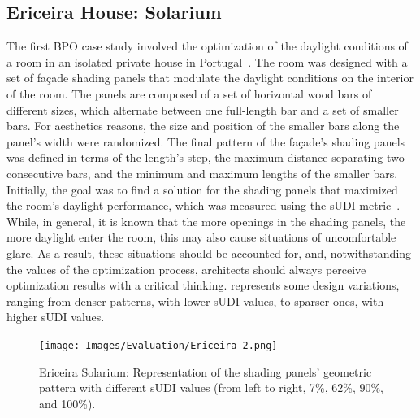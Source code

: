\subsection{Ericeira House: Solarium}
The first \ac{BPO} case study involved the optimization of the daylight conditions of a room in an isolated private house in Portugal~\cite{Caetano2018,Belem2018optimizeddesign}. The room was designed with a set of façade shading panels that modulate the daylight conditions on the interior of the room. The panels are composed of a set of horizontal wood bars of different sizes, which alternate between one full-length bar and a set of smaller bars. For aesthetics reasons, the size and position of the smaller bars along the panel's width were randomized. The final pattern of the façade's shading panels was defined in terms of the length’s step, the maximum distance separating two consecutive bars, and the minimum and maximum lengths of the smaller bars. Initially, the goal was to find a solution for the shading panels that maximized the room's daylight performance, which was measured using the \ac{sUDI} metric~\cite{Nabil2006}. While, in general, it is known that the more openings in the shading panels, the more daylight enter the room, this may also cause situations of uncomfortable glare. As a result, these situations should be accounted for, and, notwithstanding the values of the optimization process, architects should always perceive optimization results with a critical thinking.  represents some design variations, ranging from denser patterns, with lower \ac{sUDI} values, to sparser ones, with higher \ac{sUDI} values.


\begin{figure}[htpb]
	\centering
	\texttt{[image: Images/Evaluation/Ericeira\_2.png]}
	\caption{Ericeira Solarium: Representation of the shading panels’ geometric pattern with different sUDI values (from left to right, 7\%, 62\%, 90\%, and 100\%).}
	\label{fig:ericeira_multiple_panels}
\end{figure}

